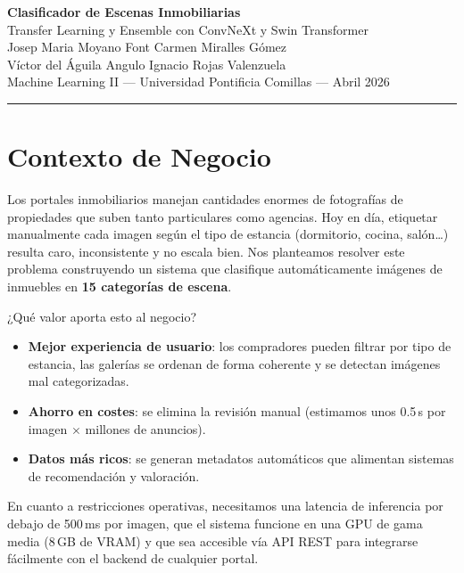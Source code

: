 \documentclass[11pt,a4paper]{article}
\begin{document}
\begin{center}
    {\LARGE\bfseries Clasificador de Escenas Inmobiliarias}\\[4pt]
    {\large Transfer Learning y Ensemble con ConvNeXt y Swin Transformer}\\[12pt]
    {\normalsize
    Josep Maria Moyano Font \quad Carmen Miralles Gómez\\[2pt]
    Víctor del Águila Angulo \quad Ignacio Rojas Valenzuela}\\[8pt]
    {\small Machine Learning II --- Universidad Pontificia Comillas --- Abril 2026}
\end{center}
\vspace{6pt}
\hrule
\vspace{12pt}


\section{Contexto de Negocio}

Los portales inmobiliarios manejan cantidades enormes de fotografías de propiedades que suben tanto particulares como agencias. Hoy en día, etiquetar manualmente cada imagen según el tipo de estancia (dormitorio, cocina, salón\ldots) resulta caro, inconsistente y no escala bien. Nos planteamos resolver este problema construyendo un sistema que clasifique automáticamente imágenes de inmuebles en \textbf{15 categorías de escena}.

¿Qué valor aporta esto al negocio?
\begin{itemize}
    \item \textbf{Mejor experiencia de usuario}: los compradores pueden filtrar por tipo de estancia, las galerías se ordenan de forma coherente y se detectan imágenes mal categorizadas.
    \item \textbf{Ahorro en costes}: se elimina la revisión manual (estimamos unos 0.5\,s por imagen $\times$ millones de anuncios).
    \item \textbf{Datos más ricos}: se generan metadatos automáticos que alimentan sistemas de recomendación y valoración.
\end{itemize}

En cuanto a restricciones operativas, necesitamos una latencia de inferencia por debajo de 500\,ms por imagen, que el sistema funcione en una GPU de gama media (8\,GB de VRAM) y que sea accesible vía API REST para integrarse fácilmente con el backend de cualquier portal.
\end{document}
